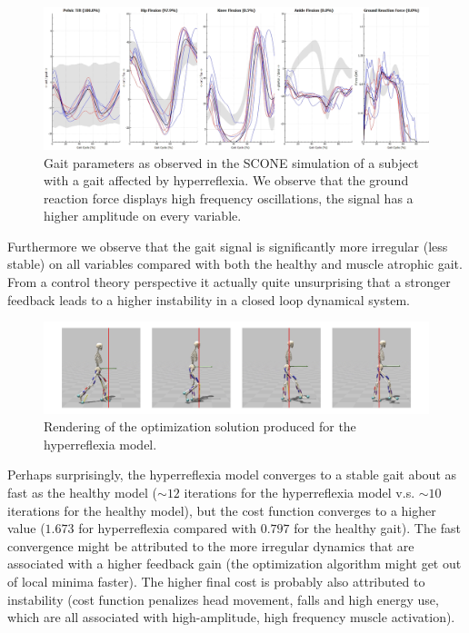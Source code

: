 \documentclass[11pt]{article}
\begin{document}
\begin{figure}[h!]
    \centering
    \includegraphics[width=\textwidth]{screens/hyperreflexia_gait.png}
    \caption{Gait parameters as observed in the SCONE simulation of a subject with a gait affected by hyperreflexia. We observe that the ground reaction force displays high frequency oscillations, the signal has a higher amplitude on every variable. }
    \label{hr_gait}
\end{figure}

Furthermore we observe that the gait signal is significantly more irregular (less stable) on all variables compared with both the healthy and muscle atrophic gait. From a control theory perspective it actually quite unsurprising that a stronger feedback leads to a higher instability in a closed loop dynamical system.

\begin{figure}[h!]
    \centering
    \includegraphics[width=\textwidth]{screens/toe_walk_hr.jpg}
    \caption{Rendering of the optimization solution produced for the hyperreflexia model.}
    \label{hr_render}
\end{figure}

Perhaps surprisingly, the hyperreflexia model converges to a stable gait about as fast as the healthy model ($\sim 12$ iterations for the hyperreflexia model v.s. $\sim 10$ iterations for the healthy model), but the cost function converges to a higher value ($1.673$ for hyperreflexia compared with $0.797$ for the healthy gait). The fast convergence might be attributed to the more irregular dynamics that are associated with a higher feedback gain (the optimization algorithm might get out of local minima faster). The higher final cost is probably also attributed to instability (cost function penalizes head movement, falls and high energy use, which are all associated with high-amplitude, high frequency muscle activation).
\end{document}
